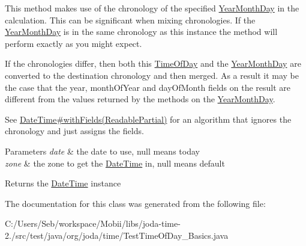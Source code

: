 This method makes use of the chronology of the specified \hyperlink{classorg_1_1joda_1_1time_1_1_year_month_day}{Year\-Month\-Day} in the calculation. This can be significant when mixing chronologies. If the \hyperlink{classorg_1_1joda_1_1time_1_1_year_month_day}{Year\-Month\-Day} is in the same chronology as this instance the method will perform exactly as you might expect. 

If the chronologies differ, then both this \hyperlink{classorg_1_1joda_1_1time_1_1_time_of_day}{Time\-Of\-Day} and the \hyperlink{classorg_1_1joda_1_1time_1_1_year_month_day}{Year\-Month\-Day} are converted to the destination chronology and then merged. As a result it may be the case that the year, month\-Of\-Year and day\-Of\-Month fields on the result are different from the values returned by the methods on the \hyperlink{classorg_1_1joda_1_1time_1_1_year_month_day}{Year\-Month\-Day}. 

See \hyperlink{classorg_1_1joda_1_1time_1_1_date_time_af2a741c180b2759467bc9e20a73106d4}{Date\-Time\#with\-Fields(\-Readable\-Partial)} for an algorithm that ignores the chronology and just assigns the fields.


\begin{DoxyParams}{Parameters}
{\em date} & the date to use, null means today \\
\hline
{\em zone} & the zone to get the \hyperlink{classorg_1_1joda_1_1time_1_1_date_time}{Date\-Time} in, null means default \\
\hline
\end{DoxyParams}
\begin{DoxyReturn}{Returns}
the \hyperlink{classorg_1_1joda_1_1time_1_1_date_time}{Date\-Time} instance 
\end{DoxyReturn}


The documentation for this class was generated from the following file\-:\begin{DoxyCompactItemize}
\item 
C\-:/\-Users/\-Seb/workspace/\-Mobii/libs/joda-\/time-\/2./src/test/java/org/joda/time/Test\-Time\-Of\-Day\-\_\-\-Basics.\-java\end{DoxyCompactItemize}
